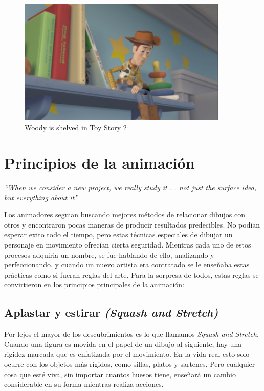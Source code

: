 \documentclass[a4paper,12pt]{report}
\begin{document}
 
\begin{figure}[ht]
    \centering
    \includegraphics[height=6cm]{Imagenes/woody_sitting}
    \caption{Woody is shelved in Toy Story 2}
    \label{fig:woody_sitting}
\end{figure}
 
 
\chapter{Principios de la animación}
 
 
\textit{``When we consider a new project, we really study it ... not just the surface idea,
but everything about it''}
 
\hspace*{\fill}{\rm --- Walt Disney}
 
 
\hspace*{\fill}
 
 
Los animadores seguian buscando mejores métodos de relacionar dibujos con 
otros y encontraron pocas maneras de producir resultados predecibles.
No podian esperar exito todo el tiempo, pero estas técnicas especiales de dibujar un personaje en movimiento
ofrecían cierta seguridad. Mientras cada uno de estos procesos adquiria un nombre, se fue hablando de ello, 
analizando y perfeccionando, y cuando un nuevo artista era contratado
se le enseñaba estas prácticas como si fueran reglas del arte.
Para la sorpresa de todos, estas reglas se convirtieron en los 
principios principales de la animación:\cite{principles_animation}
 
 
\section{Aplastar y estirar \textit{(Squash and Stretch)}}
 
Por lejos el mayor de los descubrimientos es lo que llamamos
\textit{Squash and Stretch}. Cuando una figura es movida en el papel de un dibujo al siguiente,
hay una rigidez marcada que es enfatizada por el movimiento. En la vida real esto solo ocurre con los objetos más rígidos,
como sillas, platos y sartenes. Pero cualquier cosa que esté viva, sin importar cuantos huesos tiene, 
enseñará un cambio considerable en su forma mientras realiza acciones.\cite{principles_animation}
 
\end{document}
